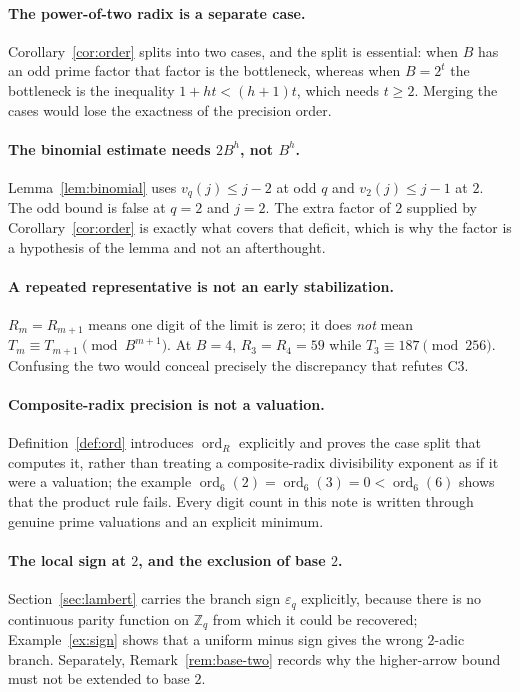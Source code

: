 \documentclass[11pt,letterpaper]{article}
\numberwithin{equation}{section}
\theoremstyle{definition}
\theoremstyle{remark}
\newcommand{\Z}{\mathbb Z}
\newcommand{\eps}{\varepsilon}
\DeclareMathOperator{\ordop}{ord}
\begin{document}
\paragraph{The power-of-two radix is a separate case.}
Corollary~\ref{cor:order} splits into two cases, and the split is essential: when $B$ has an odd prime factor that factor is the bottleneck, whereas when $B=2^t$ the bottleneck is the inequality $1+ht<(h+1)t$, which needs $t\ge2$. Merging the cases would lose the exactness of the precision order.

\paragraph{The binomial estimate needs $2B^h$, not $B^h$.}
Lemma~\ref{lem:binomial} uses $v_q(j)\le j-2$ at odd $q$ and $v_2(j)\le j-1$ at $2$. The odd bound is false at $q=2$ and $j=2$. The extra factor of $2$ supplied by Corollary~\ref{cor:order} is exactly what covers that deficit, which is why the factor is a hypothesis of the lemma and not an afterthought.

\paragraph{A repeated representative is not an early stabilization.}
$R_m=R_{m+1}$ means one digit of the limit is zero; it does \emph{not} mean $T_m\equiv T_{m+1}\pmod{B^{m+1}}$. At $B=4$, $R_3=R_4=59$ while $T_3\equiv187\pmod{256}$. Confusing the two would conceal precisely the discrepancy that refutes C3.

\paragraph{Composite-radix precision is not a valuation.}
Definition~\ref{def:ord} introduces $\ordop_R$ explicitly and proves the case split that computes it, rather than treating a composite-radix divisibility exponent as if it were a valuation; the example $\ordop_6(2)=\ordop_6(3)=0<\ordop_6(6)$ shows that the product rule fails. Every digit count in this note is written through genuine prime valuations and an explicit minimum.

\paragraph{The local sign at $2$, and the exclusion of base $2$.}
Section~\ref{sec:lambert} carries the branch sign $\eps_q$ explicitly, because there is no continuous parity function on $\Z_q$ from which it could be recovered; Example~\ref{ex:sign} shows that a uniform minus sign gives the wrong $2$-adic branch. Separately, Remark~\ref{rem:base-two} records why the higher-arrow bound must not be extended to base $2$.
\end{document}
